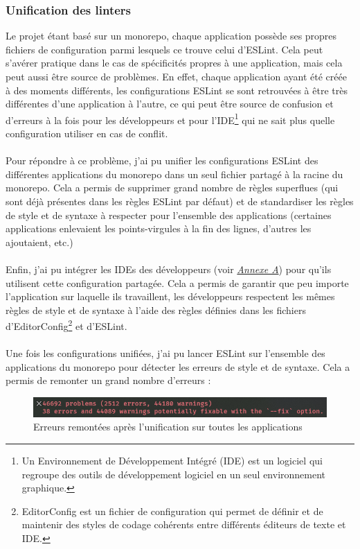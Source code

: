 \documentclass[12pt, a4paper]{report}
\begin{document}
	\newpage
	\subsubsection{Unification des linters}
	\label{sec:linters}

	Le projet étant basé sur un monorepo, chaque application possède ses propres fichiers de configuration parmi lesquels ce trouve celui d'ESLint. Cela peut s'avérer pratique dans le cas de spécificités propres à une application, mais cela peut aussi être source de problèmes. En effet, chaque application ayant été créée à des moments différents, les configurations ESLint se sont retrouvées à être très différentes d'une application à l'autre, ce qui peut être source de confusion et d'erreurs à la fois pour les développeurs et pour l'IDE\footnote{Un Environnement de Développement Intégré (IDE) est un logiciel qui regroupe des outils de développement logiciel en un seul environnement graphique.} qui ne sait plus quelle configuration utiliser en cas de conflit.
	\\\\
	Pour répondre à ce problème, j'ai pu unifier les configurations ESLint des différentes applications du monorepo dans un seul fichier partagé à la racine du monorepo. Cela a permis de supprimer grand nombre de règles superflues (qui sont déjà présentes dans les règles ESLint par défaut) et de standardiser les règles de style et de syntaxe à respecter pour l'ensemble des applications (certaines applications enlevaient les points-virgules à la fin des lignes, d'autres les ajoutaient, etc.)
	\\\\
	Enfin, j'ai pu intégrer les IDEs des développeurs (voir \hyperref[sec:outils]{\it{Annexe A}}) pour qu'ils utilisent cette configuration partagée. Cela a permis de garantir que peu importe l'application sur laquelle ils travaillent, les développeurs respectent les mêmes règles de style et de syntaxe à l'aide des règles définies dans les fichiers d'EditorConfig\footnote{EditorConfig est un fichier de configuration qui permet de définir et de maintenir des styles de codage cohérents entre différents éditeurs de texte et IDE.} et d'ESLint.
	\\\\
	Une fois les configurations unifiées, j'ai pu lancer ESLint sur l'ensemble des applications du monorepo pour détecter les erreurs de style et de syntaxe. Cela a permis de remonter un grand nombre d'erreurs :

	\begin{figure}[!h]
		\centering
		\includegraphics[width=1\textwidth]{assets/images/lint_errors.png}
		\vspace{-.6cm}
		\caption{Erreurs remontées après l'unification sur toutes les applications}
	\end{figure}
\end{document}
